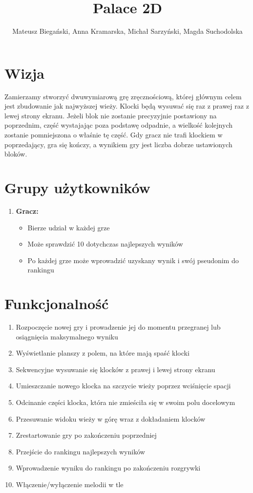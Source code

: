 \documentclass{article}
\begin{document}
\title{Palace 2D}

\author{Mateusz Biegański, Anna Kramarska, Michał Sarzyński, Magda Suchodolska}
\maketitle

\section{Wizja}

Zamierzamy stworzyć dwuwymiarową grę zręcznościową, której głównym celem jest zbudowanie jak najwyższej wieży.
Klocki będą wysuwać się raz z prawej raz z lewej strony ekranu.
Jeżeli blok nie zostanie precyzyjnie postawiony na poprzednim, część wystajając poza podstawę odpadnie, a wielkość kolejnych zostanie pomniejszona o właśnie tę część.
Gdy gracz nie trafi klockiem w poprzedający, gra się kończy, a wynikiem gry jest liczba dobrze ustawionych bloków.

\section{Grupy użytkowników}
\begin{enumerate}
\item\textbf{Gracz:}
  \begin{itemize}
  \item Bierze udział w każdej grze
  \item Może sprawdzić 10 dotychczas najlepszych wyników
  \item Po każdej grze może wprowadzić uzyskany wynik i swój pseudonim do rankingu
  \end{itemize}
\end{enumerate}

\section{Funkcjonalność}
\begin{enumerate}
\item Rozpoczęcie nowej gry i prowadzenie jej do momentu przegranej lub osiągnięcia maksymalnego wyniku
\item Wyświetlanie planszy z polem, na które mają spaść klocki
\item Sekwencyjne wysuwanie się klocków z prawej i lewej strony ekranu
\item Umieszczanie nowego klocka na szczycie wieży poprzez wciśnięcie spacji
\item Odcinanie części klocka, która nie zmieściła się w swoim polu docelowym
\item Przesuwanie widoku wieży w górę wraz z dokładaniem klocków
\item Zrestartowanie gry po zakończeniu poprzedniej
\item Przejście do rankingu najlepszych wyników
\item Wprowadzenie wyniku do rankingu po zakończeniu rozgrywki
\item Włączenie/wyłączenie melodii w tle
\end{enumerate}
\end{document}
